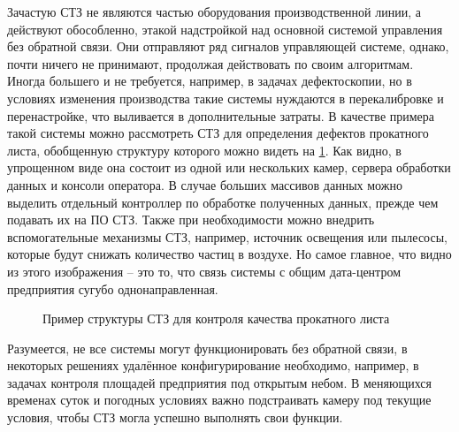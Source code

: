 Зачастую СТЗ не являются частью оборудования производственной линии, а действуют обособленно, этакой надстройкой над основной системой управления без обратной связи. Они отправляют ряд сигналов управляющей системе, однако, почти ничего не принимают, продолжая действовать по своим алгоритмам. Иногда большего и не требуется, например, в задачах дефектоскопии, но в условиях изменения производства такие системы нуждаются в перекалибровке и перенастройке, что выливается в дополнительные затраты. В качестве примера такой системы можно рассмотреть СТЗ для определения дефектов прокатного листа, обобщенную структуру которого можно видеть на \cref{fig:cv-line}. Как видно, в упрощенном виде она состоит из одной или нескольких камер, сервера обработки данных и консоли оператора. В случае больших массивов данных можно выделить отдельный контроллер по обработке полученных данных, прежде чем подавать их на ПО СТЗ. Также при необходимости можно внедрить вспомогательные механизмы СТЗ, например, источник освещения или пылесосы, которые будут снижать количество частиц в воздухе. Но самое главное, что видно из этого изображения -- это то, что связь системы с общим дата-центром предприятия сугубо однонаправленная.

\begin{figure}[ht]
	\caption{Пример структуры СТЗ для контроля качества прокатного листа}\label{fig:cv-line}
\end{figure}

Разумеется, не все системы могут функционировать без обратной связи, в некоторых решениях удалённое конфигурирование необходимо, например, в задачах контроля площадей предприятия под открытым небом. В меняющихся временах суток и погодных условиях важно подстраивать камеру под текущие условия, чтобы СТЗ могла успешно выполнять свои функции.

